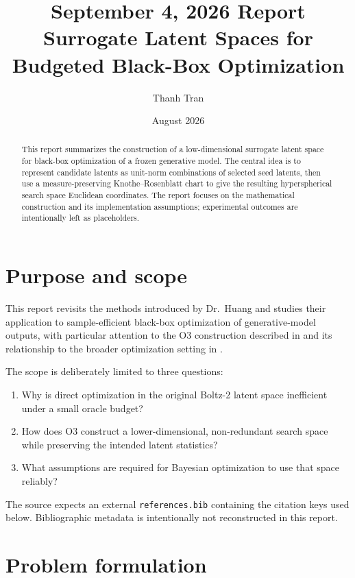 \documentclass[11pt]{article}
\title{September 4, 2026 Report\\[0.5em]
       \large Surrogate Latent Spaces for Budgeted Black-Box Optimization}
\author{Thanh Tran}
\date{August 2026}
\begin{document}
\maketitle

\begin{abstract}
This report summarizes the construction of a low-dimensional surrogate latent
space for black-box optimization of a frozen generative model.  The central
idea is to represent candidate latents as unit-norm combinations of selected
seed latents, then use a measure-preserving Knothe--Rosenblatt chart to give
the resulting hyperspherical search space Euclidean coordinates.  The report
focuses on the mathematical construction and its implementation assumptions;
experimental outcomes are intentionally left as placeholders.
\end{abstract}

\section{Purpose and scope}

This report revisits the methods introduced by Dr.~Huang and studies their
application to sample-efficient black-box optimization of generative-model
outputs, with particular attention to the O3 construction described in
\textcite{kalisz2026spendoraclebudgetpractical} and its relationship to the
broader optimization setting in
\textcite{willis2026sampleefficientoptimisationoutputsgenerative}.

The scope is deliberately limited to three questions:
\begin{enumerate}
    \item Why is direct optimization in the original Boltz-2 latent space
          inefficient under a small oracle budget?
    \item How does O3 construct a lower-dimensional, non-redundant search
          space while preserving the intended latent statistics?
    \item What assumptions are required for Bayesian optimization to use
          that space reliably?
\end{enumerate}

The source expects an external \texttt{references.bib} containing the citation
keys used below.  Bibliographic metadata is intentionally not reconstructed in
this report.

\section{Problem formulation}
\label{sec:problem}
\end{document}
